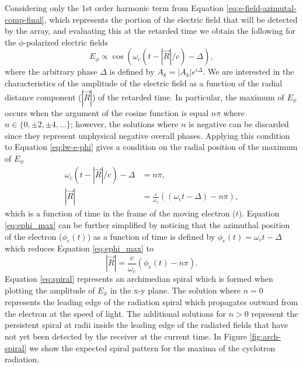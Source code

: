 Considering only the 1st order harmonic term from Equation \ref{eq:e-field-azimutal-comp-final}, which represents the portion of the electric field that will be detected by the array, and evaluating this at the retarded time we obtain the following for the $\phi$-polarized electric fields
\begin{equation}
    \label{eq:lw-e-phi}
    E_\phi \propto \cos{\left(\omega_c\left(t - |\vec{R}|/c\right)-\Delta\right)},
\end{equation}
where the arbitrary phase $\Delta$ is defined by $A_k=|A_k|e^{i\Delta}$. We are interested in the characteristics of the amplitude of the electric field as a function of the radial distance component ($|\vec{R}|$) of the retarded time. In particular, the maximum of $E_\phi$ occurs when the argument of the cosine function is equal $n\pi$ where $n\in\{0,\pm2,\pm4,...\}$; however, the solutions where $n$ is negative can be discarded since they represent unphysical negative overall phases. Applying this condition to Equation \ref{eq:lw-e-phi} gives a condition on the radial position of the maximum of $E_\phi$
\begin{subequations}
\label{eq:ephi_max}
  \begin{align}
      \omega_c (t-|\vec{R}|/c)-\Delta & = n\pi,\\
      |\vec{R}| & = \frac{c}{\omega_c}\left((\omega_c t-\Delta)-n\pi\right),
  \end{align}
\end{subequations}
which is a function of time in the frame of the moving electron ($t$). Equation \ref{eq:ephi_max} can be further simplified by noticing that the azimuthal position of the electron ($\phi_e(t)$) as a function of time is defined by $\phi_e(t)=\omega_c t - \Delta$ which reduces Equation \ref{eq:ephi_max} to
\begin{equation}
\label{eq:spiral}
    |\vec R| = \frac{c}{\omega_c}(\phi_e(t)-n\pi).
\end{equation}
Equation \ref{eq:spiral} represents an archimedian spiral which is formed when plotting the amplitude of $E_\phi$ in the x-y plane. The solution where $n=0$ represents the leading edge of the radiation spiral which propagates outward from the electron at the speed of light. The additional solutions for $n>0$ represent the persistent spiral at radii inside the leading edge of the radiated fields that have not yet been detected by the receiver at the current time. In Figure \ref{fig:arch-spiral} we show the expected spiral pattern for the maxima of the cyclotron radiation. 

